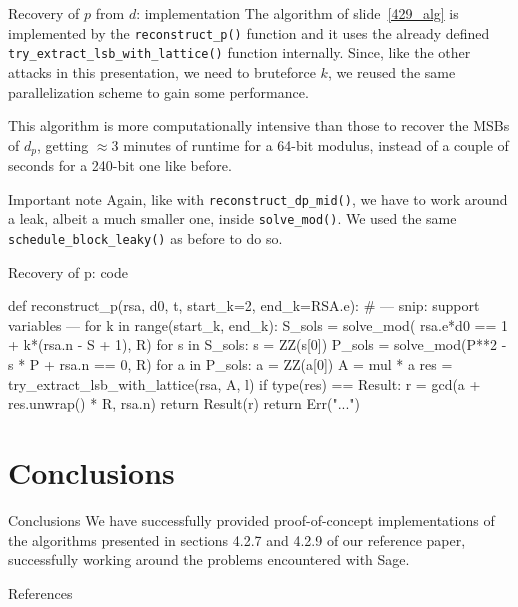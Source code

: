\documentclass[usepdftitle=false]{beamer}
\begin{document}
\begin{frame}[fragile=singleslide]{Recovery of $p$ from $d$: implementation}
The algorithm of slide~\ref{429_alg} is implemented by the \texttt{reconstruct\_p()} function and it
uses the already defined \texttt{try\_extract\_lsb\_with\_lattice()} function internally. Since, like
the other attacks in this presentation, we need to bruteforce $k$, we reused the same parallelization 
scheme to gain some performance.
\vspace{10pt}

This algorithm is more computationally intensive than those to recover the MSBs of $d_p$, 
getting $\approx$3 minutes of runtime for a 64-bit modulus, instead of a couple of seconds for
a 240-bit one like before.

\begin{alertblock}{Important note}
Again, like with \texttt{reconstruct\_dp\_mid()}, we have to work around a leak, albeit a much smaller one,
inside \texttt{solve\_mod()}. We used the same \texttt{schedule\_block\_leaky()} as before to do so.
\end{alertblock}
\end{frame}
\begin{frame}[fragile=singleslide]{Recovery of p: code}
\begin{python}
def reconstruct_p(rsa, d0, t, start_k=2, end_k=RSA.e):
  # --- snip: support variables ---
  for k in range(start_k, end_k):
    S_sols = solve_mod(
      rsa.e*d0 == 1 + k*(rsa.n - S + 1), R)
    for s in S_sols:
      s = ZZ(s[0])
      P_sols = solve_mod(P**2 - s * P + rsa.n == 0, R)
      for a in P_sols:
        a = ZZ(a[0])
        A = mul * a
        res = try_extract_lsb_with_lattice(rsa, A, l)
        if type(res) == Result:
          r = gcd(a + res.unwrap() * R, rsa.n)
          return Result(r)
  return Err("...")
\end{python}
\end{frame}

\section{Conclusions}
\begin{frame}{Conclusions}
We have successfully provided proof-of-concept implementations of the algorithms presented in sections
4.2.7 and 4.2.9 of our reference paper, successfully working around the problems encountered with Sage.
\end{frame}

\begin{frame}{References}


\end{frame}
\end{document}

